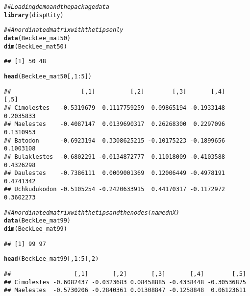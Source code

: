 \documentclass{article}\usepackage[]{graphicx}\usepackage[]{color}
\makeatletter
\newcommand{\hlnum}[1]{\textcolor[rgb]{0.686,0.059,0.569}{#1}}%
\newcommand{\hlcom}[1]{\textcolor[rgb]{0.678,0.584,0.686}{\textit{#1}}}%
\newcommand{\hlopt}[1]{\textcolor[rgb]{0,0,0}{#1}}%
\newcommand{\hlstd}[1]{\textcolor[rgb]{0.345,0.345,0.345}{#1}}%
\newcommand{\hlkwd}[1]{\textcolor[rgb]{0.737,0.353,0.396}{\textbf{#1}}}%
\newenvironment{kframe}{%
 \def\at@end@of@kframe{}%
 \ifinner\ifhmode%
  \def\at@end@of@kframe{\end{minipage}}%
  \begin{minipage}{\columnwidth}%
 \fi\fi%
 \def\FrameCommand##1{\hskip\@totalleftmargin \hskip-\fboxsep
 \colorbox{shadecolor}{##1}\hskip-\fboxsep
     \hskip-\linewidth \hskip-\@totalleftmargin \hskip\columnwidth}%
 \MakeFramed {\advance\hsize-\width
   \@totalleftmargin\z@ \linewidth\hsize
   \@setminipage}}%
 {\par\unskip\endMakeFramed%
 \at@end@of@kframe}
\newenvironment{knitrout}{}{} %
\makeatother
\begin{document}
\begin{knitrout}
\color{fgcolor}\begin{kframe}
\begin{alltt}
\hlcom{## Loading demo and the package data}
\hlkwd{library}\hlstd{(dispRity)}
\end{alltt}


{\ttfamily\noindent\itshape\color{messagecolor}{\#\# Loading required package: paleotree}}\begin{alltt}
\hlcom{## An ordinated matrix with the tips only}
\hlkwd{data}\hlstd{(BeckLee_mat50)}
\hlkwd{dim}\hlstd{(BeckLee_mat50)}
\end{alltt}
\begin{verbatim}
## [1] 50 48
\end{verbatim}
\begin{alltt}
\hlkwd{head}\hlstd{(BeckLee_mat50[,}\hlnum{1}\hlopt{:}\hlnum{5}\hlstd{])}
\end{alltt}
\begin{verbatim}
##                    [,1]          [,2]        [,3]       [,4]      [,5]
## Cimolestes   -0.5319679  0.1117759259  0.09865194 -0.1933148 0.2035833
## Maelestes    -0.4087147  0.0139690317  0.26268300  0.2297096 0.1310953
## Batodon      -0.6923194  0.3308625215 -0.10175223 -0.1899656 0.1003108
## Bulaklestes  -0.6802291 -0.0134872777  0.11018009 -0.4103588 0.4326298
## Daulestes    -0.7386111  0.0009001369  0.12006449 -0.4978191 0.4741342
## Uchkudukodon -0.5105254 -0.2420633915  0.44170317 -0.1172972 0.3602273
\end{verbatim}
\begin{alltt}
\hlcom{## An ordinated matrix with the tips and the nodes (named nX)}
\hlkwd{data}\hlstd{(BeckLee_mat99)}
\hlkwd{dim}\hlstd{(BeckLee_mat99)}
\end{alltt}
\begin{verbatim}
## [1] 99 97
\end{verbatim}
\begin{alltt}
\hlkwd{head}\hlstd{(BeckLee_mat99[,}\hlnum{1}\hlopt{:}\hlnum{5}\hlstd{],} \hlnum{2}\hlstd{)}
\end{alltt}
\begin{verbatim}
##                  [,1]       [,2]       [,3]       [,4]        [,5]
## Cimolestes -0.6082437 -0.0323683 0.08458885 -0.4338448 -0.30536875
## Maelestes  -0.5730206 -0.2840361 0.01308847 -0.1258848  0.06123611
\end{verbatim}
\begin{alltt}

\end{alltt}
\end{kframe}
\end{knitrout}
\end{document}
